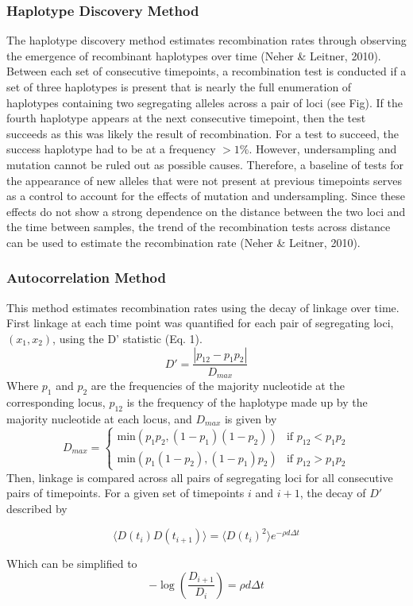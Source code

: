 \documentclass[12pt]{article}
\begin{document}
\subsubsection*{Haplotype Discovery Method}
The haplotype discovery method estimates recombination rates through observing the emergence of recombinant haplotypes over time (Neher \& Leitner, 2010). Between each set of consecutive timepoints, a recombination test is conducted if a set of three haplotypes is present that is nearly the full enumeration of haplotypes containing two segregating alleles across a pair of loci (see Fig). If the fourth haplotype appears at the next consecutive timepoint, then the test succeeds as this was likely the result of recombination. For a test to succeed, the success haplotype had to be at a frequency $>1\%$.  However, undersampling and mutation cannot be ruled out as possible causes. Therefore, a baseline of tests for the appearance of new alleles that were not present at previous timepoints serves as a control to account for the effects of mutation and undersampling. Since these effects do not show a strong dependence on the distance between the two loci and the time between samples, the trend of the recombination tests across distance can be used to estimate the recombination rate (Neher \& Leitner, 2010).
\newpage
\subsubsection*{Autocorrelation Method}

    This method estimates recombination rates using the decay of linkage over time. First linkage at each time point was quantified for each pair of segregating loci, $(x_1, x_2)$, using the D’ statistic (Eq. 1). 
 \begin{equation}
 D' = \frac{|p_{12} - p_1p_2|}{D_{max}}
 \end{equation}
     Where $p_1$ and $p_2$ are the frequencies of the majority nucleotide at the corresponding locus, $p_{12}$ is the frequency of the haplotype made up by the majority nucleotide at each locus, and $D_{max}$ is given by
\[
    D_{max} = \begin{cases}
    \text{min}(p_1p_2, (1-p_1)(1-p_2)) & \text{if }p_{12} < p_1p_2\\
    \text{min}(p_1(1-p_2), (1-p_1)p_2) & \text{if }p_{12} > p_1p_2
    \end{cases}
\]
Then, linkage is compared across all pairs of segregating loci for all consecutive pairs of timepoints. For a given set of timepoints $i$ and $i+1$, the decay of $D'$ described by

\begin{equation}
\langle D(t_i)D(t_{i+1}) \rangle = \langle D(t_i)^2 \rangle e^{-\rho d \Delta t}
\end{equation}

Which can be simplified to
\begin{equation}
-\log \left(\frac{D_{i+1}}{D_i}\right) = \rho d \Delta t
\end{equation}
\end{document}
